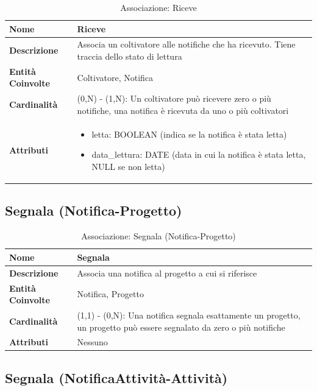 \documentclass[12pt,a4paper]{article}
\begin{document}
\begin{table}[H]
\centering
\caption{Associazione: Riceve}
\begin{tabularx}{\textwidth}{|l|X|}
\hline
\textbf{Nome} & Riceve \\
\hline
\textbf{Descrizione} & Associa un coltivatore alle notifiche che ha ricevuto. Tiene traccia dello stato di lettura \\
\hline
\textbf{Entità Coinvolte} & Coltivatore, Notifica \\
\hline
\textbf{Cardinalità} & (0,N) - (1,N): Un coltivatore può ricevere zero o più notifiche, una notifica è ricevuta da uno o più coltivatori \\
\hline
\textbf{Attributi} & 
\begin{itemize}[nosep]
    \item letta: BOOLEAN (indica se la notifica è stata letta)
    \item data\_lettura: DATE (data in cui la notifica è stata letta, NULL se non letta)
\end{itemize} \\
\hline
\end{tabularx}
\end{table}

\subsection{Segnala (Notifica-Progetto)}

\begin{table}[H]
\centering
\caption{Associazione: Segnala (Notifica-Progetto)}
\begin{tabularx}{\textwidth}{|l|X|}
\hline
\textbf{Nome} & Segnala \\
\hline
\textbf{Descrizione} & Associa una notifica al progetto a cui si riferisce \\
\hline
\textbf{Entità Coinvolte} & Notifica, Progetto \\
\hline
\textbf{Cardinalità} & (1,1) - (0,N): Una notifica segnala esattamente un progetto, un progetto può essere segnalato da zero o più notifiche \\
\hline
\textbf{Attributi} & Nessuno \\
\hline
\end{tabularx}
\end{table}

\subsection{Segnala (NotificaAttività-Attività)}
\end{document}
